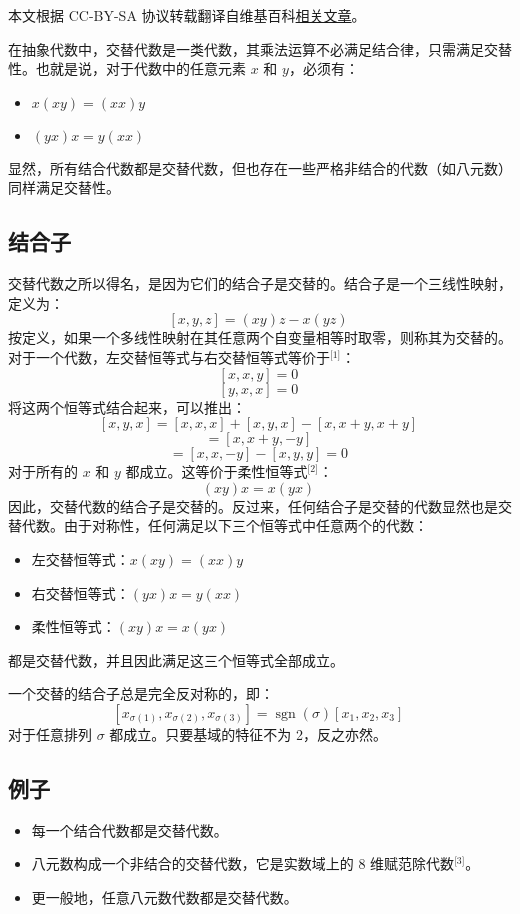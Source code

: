 
本文根据 CC-BY-SA 协议转载翻译自维基百科\href{https://en.wikipedia.org/wiki/Alternative_algebra}{相关文章}。

在抽象代数中，交替代数是一类代数，其乘法运算不必满足结合律，只需满足交替性。也就是说，对于代数中的任意元素 $x$ 和 $y$，必须有：
\begin{itemize}
\item $x(xy) = (xx)y$
\item $(yx)x = y(xx)$
\end{itemize}
显然，所有结合代数都是交替代数，但也存在一些严格非结合的代数（如八元数）同样满足交替性。
\subsection{结合子}
交替代数之所以得名，是因为它们的结合子是交替的。结合子是一个三线性映射，定义为：
$$
[x, y, z] = (xy)z - x(yz)~
$$
按定义，如果一个多线性映射在其任意两个自变量相等时取零，则称其为交替的。对于一个代数，左交替恒等式与右交替恒等式等价于\(^\text{[1]}\)：
$$
[x, x, y] = 0~
$$
$$
[y, x, x] = 0~
$$
将这两个恒等式结合起来，可以推出：
$$
[x, y, x] = [x, x, x] + [x, y, x] - [x, x+y, x+y]~
$$
$$
= [x, x+y, -y]~
$$
$$
= [x, x, -y] - [x, y, y] = 0~
$$
对于所有的 $x$ 和 $y$ 都成立。这等价于柔性恒等式\(^\text{[2]}\)：
$$
(xy)x = x(yx)~
$$
因此，交替代数的结合子是交替的。反过来，任何结合子是交替的代数显然也是交替代数。由于对称性，任何满足以下三个恒等式中任意两个的代数：
\begin{itemize}
\item 左交替恒等式：$x(xy) = (xx)y$
\item 右交替恒等式：$(yx)x = y(xx)$
\item 柔性恒等式：$(xy)x = x(yx)$
\end{itemize}
都是交替代数，并且因此满足这三个恒等式全部成立。

一个交替的结合子总是完全反对称的，即：
$$
[x_{\sigma(1)}, x_{\sigma(2)}, x_{\sigma(3)}] = \operatorname{sgn}(\sigma) [x_1, x_2, x_3]~
$$
对于任意排列 $\sigma$ 都成立。只要基域的特征不为 2，反之亦然。
\subsection{例子}
\begin{itemize}
\item 每一个结合代数都是交替代数。
\item 八元数构成一个非结合的交替代数，它是实数域上的 8 维赋范除代数\(^\text{[3]}\)。
\item 更一般地，任意八元数代数都是交替代数。
\end{itemize}
